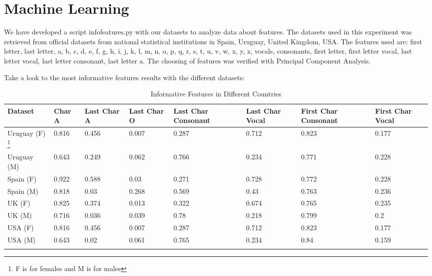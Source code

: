 \documentclass[a4paper]{article}
\begin{document}
\section{Machine Learning}

We have developed a script infofeatures.py with our datasets to
analyze data about features. The datasets used in this experiment was
retrieved from official datasets from national statistical
institutions in Spain, Uruguay, United Kingdom, USA. The features used
are: first letter, last letter, a, b, c, d, e, f, g, h, i, j, k, l, m,
n, o, p, q, r, s, t, u, v, w, x, y, z, vocals, consonants, first
letter, first letter vocal, last letter vocal, last letter consonant,
last letter a. The choosing of features was verified with Principal
Component Analysis.

Take a look to the most informative features results with the
different datasets:
\begin{longtable}[]{@{}llllllll@{}}
  \toprule
Dataset & Char A & Last Char A & Last Char O & Last Char Consonant & Last Char Vocal & First Char Consonant & First Char Vocal & \tabularnewline
  \midrule
  \endhead
 Uruguay (F) \footnote{F is for females and M is for males} &    0.816 &         0.456 &         0.007 &                 0.287 &             0.712 &                  0.823 &              0.177 & \tabularnewline
 Uruguay (M) \footnotemark[3] &    0.643 &         0.249 &         0.062 &                 0.766 &             0.234 &                  0.771 &              0.228 & \tabularnewline
 Spain (F) \footnotemark[3]  &    0.922 &         0.588 &          0.03 &                 0.271 &             0.728 &                  0.772 &              0.228 & \tabularnewline
 Spain (M) \footnotemark[3]  &    0.818 &          0.03 &         0.268 &                 0.569 &              0.43 &                  0.763 &              0.236 & \tabularnewline
 UK (F) \footnotemark[3]     &    0.825 &         0.374 &         0.013 &                 0.322 &             0.674 &                  0.765 &              0.235 & \tabularnewline
 UK (M) \footnotemark[3]     &    0.716 &         0.036 &         0.039 &                  0.78 &             0.218 &                  0.799 &                0.2 & \tabularnewline
 USA (F) \footnotemark[3]    &    0.816 &         0.456 &         0.007 &                 0.287 &             0.712 &                  0.823 &              0.177 & \tabularnewline
 USA (M) \footnotemark[3]    &    0.643 &          0.02 &         0.061 &                 0.765 &             0.234 &                   0.84 &              0.159 & \tabularnewline
\bottomrule
\caption{Informative Features in Different Countries}
\label{table:InfoFeatures}
\end{longtable}
\end{document}
